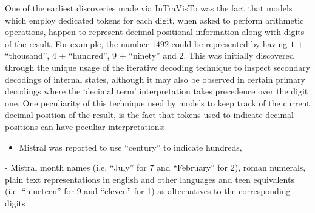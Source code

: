 One of the earliest discoveries made via InTraVisTo was the fact that models which employ dedicated tokens for each digit, when asked to perform arithmetic operations, happen to represent decimal positional information along with digits of the result.
For example, the number $1492$ could be represented by having $1$ + ``thousand'', $4$ + ``hundred'', $9$ + ``ninety'' and $2$.
This was initially discovered through the unique usage of the iterative decoding technique  to inspect secondary decodings of internal states, although it may also be observed in certain primary decodings where the `decimal term' interpretation takes precedence over the digit one. 
One peculiarity of this technique used by models to keep track of the current decimal position of the result, is the fact that tokens used to indicate decimal positions can have peculiar interpretations:
\begin{itemize}
    \item Mistral was reported to use ``century'' to indicate hundreds, 
\end{itemize}

- Mistral 
month names (i.e. ``July'' for 7 and ``February'' for 2), roman numerals, plain text representations in english and other languages and teen equivalents (i.e. ``nineteen'' for 9 and ``eleven'' for 1) as alternatives to the corresponding digits 

